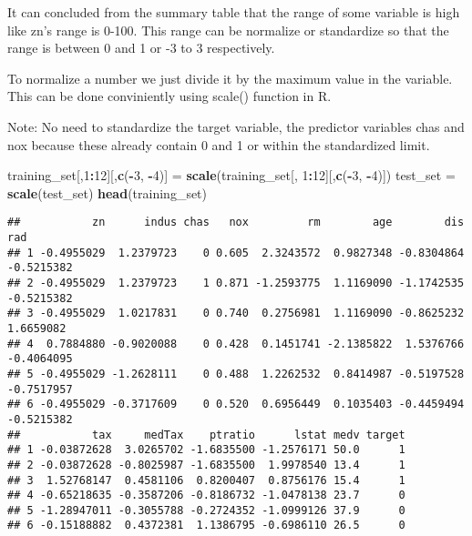 \documentclass[
]{article}
\newenvironment{Shaded}{\begin{snugshade}}{\end{snugshade}}
\newcommand{\DecValTok}[1]{\textcolor[rgb]{0.00,0.00,0.81}{#1}}
\newcommand{\FunctionTok}[1]{\textcolor[rgb]{0.13,0.29,0.53}{\textbf{#1}}}
\newcommand{\NormalTok}[1]{#1}
\newcommand{\OtherTok}[1]{\textcolor[rgb]{0.56,0.35,0.01}{#1}}
\newcommand{\SpecialCharTok}[1]{\textcolor[rgb]{0.81,0.36,0.00}{\textbf{#1}}}
\begin{document}
It can concluded from the summary table that the range of some variable
is high like zn's range is 0-100. This range can be normalize or
standardize so that the range is between 0 and 1 or -3 to 3
respectively.

To normalize a number we just divide it by the maximum value in the
variable. This can be done conviniently using scale() function in R.

Note: No need to standardize the target variable, the predictor
variables chas and nox because these already contain 0 and 1 or within
the standardized limit.

\begin{Shaded}
\begin{Highlighting}[]
\NormalTok{training\_set[,}\DecValTok{1}\SpecialCharTok{:}\DecValTok{12}\NormalTok{][,}\FunctionTok{c}\NormalTok{(}\SpecialCharTok{{-}}\DecValTok{3}\NormalTok{, }\SpecialCharTok{{-}}\DecValTok{4}\NormalTok{)] }\OtherTok{=} \FunctionTok{scale}\NormalTok{(training\_set[, }\DecValTok{1}\SpecialCharTok{:}\DecValTok{12}\NormalTok{][,}\FunctionTok{c}\NormalTok{(}\SpecialCharTok{{-}}\DecValTok{3}\NormalTok{, }\SpecialCharTok{{-}}\DecValTok{4}\NormalTok{)])}
\NormalTok{test\_set }\OtherTok{=} \FunctionTok{scale}\NormalTok{(test\_set)}
\FunctionTok{head}\NormalTok{(training\_set)}
\end{Highlighting}
\end{Shaded}

\begin{verbatim}
##           zn      indus chas   nox         rm        age        dis        rad
## 1 -0.4955029  1.2379723    0 0.605  2.3243572  0.9827348 -0.8304864 -0.5215382
## 2 -0.4955029  1.2379723    1 0.871 -1.2593775  1.1169090 -1.1742535 -0.5215382
## 3 -0.4955029  1.0217831    0 0.740  0.2756981  1.1169090 -0.8625232  1.6659082
## 4  0.7884880 -0.9020088    0 0.428  0.1451741 -2.1385822  1.5376766 -0.4064095
## 5 -0.4955029 -1.2628111    0 0.488  1.2262532  0.8414987 -0.5197528 -0.7517957
## 6 -0.4955029 -0.3717609    0 0.520  0.6956449  0.1035403 -0.4459494 -0.5215382
##           tax     medTax    ptratio      lstat medv target
## 1 -0.03872628  3.0265702 -1.6835500 -1.2576171 50.0      1
## 2 -0.03872628 -0.8025987 -1.6835500  1.9978540 13.4      1
## 3  1.52768147  0.4581106  0.8200407  0.8756176 15.4      1
## 4 -0.65218635 -0.3587206 -0.8186732 -1.0478138 23.7      0
## 5 -1.28947011 -0.3055788 -0.2724352 -1.0999126 37.9      0
## 6 -0.15188882  0.4372381  1.1386795 -0.6986110 26.5      0
\end{verbatim}
\end{document}

